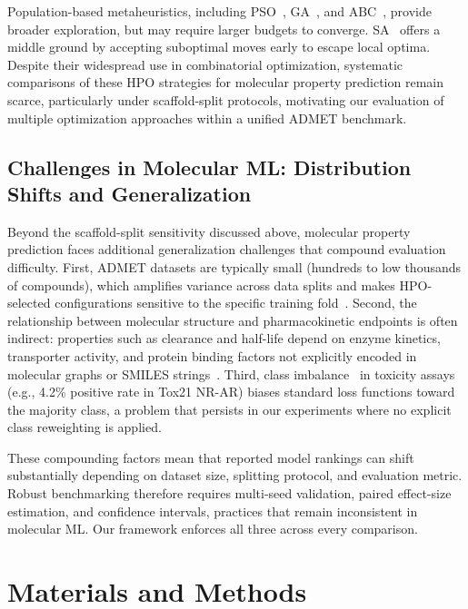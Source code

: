 \documentclass[journal]{IEEEtran}
\begin{document}
Population-based metaheuristics, including PSO~\cite{kennedy1995pso}, GA~\cite{holland1975ga}, and ABC~\cite{karaboga2005abc}, provide broader exploration, but may require larger budgets to converge. SA~\cite{saopt} offers a middle ground by accepting suboptimal moves early to escape local optima. Despite their widespread use in combinatorial optimization, systematic comparisons of these HPO strategies for molecular property prediction remain scarce, particularly under scaffold-split protocols, motivating our evaluation of multiple optimization approaches within a unified ADMET benchmark.


\subsection{Challenges in Molecular ML: Distribution Shifts and Generalization}
Beyond the scaffold-split sensitivity discussed above, molecular property prediction faces additional generalization challenges that compound evaluation difficulty. First, ADMET datasets are typically small (hundreds to low thousands of compounds), which amplifies variance across data splits and makes HPO-selected configurations sensitive to the specific training fold~\cite{wu2018moleculenet}. Second, the relationship between molecular structure and pharmacokinetic endpoints is often indirect: properties such as clearance and half-life depend on enzyme kinetics, transporter activity, and protein binding factors not explicitly encoded in molecular graphs or SMILES strings~\cite{obach1999prediction}. Third, class imbalance~\cite{he2009imbalanced} in toxicity assays (e.g., 4.2\% positive rate in Tox21 NR-AR) biases standard loss functions toward the majority class, a problem that persists in our experiments where no explicit class reweighting is applied.

These compounding factors mean that reported model rankings can shift substantially depending on dataset size, splitting protocol, and evaluation metric. Robust benchmarking therefore requires multi-seed validation, paired effect-size estimation, and confidence intervals, practices that remain inconsistent in molecular ML. Our framework enforces all three across every comparison.



\section{Materials and Methods}
\label{sec:methods}
\end{document}
